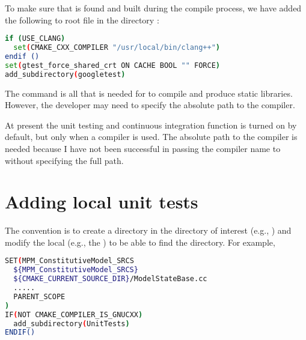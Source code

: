 To make sure that  is found and built during the compile process,
we have added the following to root  file in the directory
:
\begin{lstlisting}[language=sh, backgroundcolor=\color{background}]
if (USE_CLANG)
  set(CMAKE_CXX_COMPILER "/usr/local/bin/clang++")
endif ()
set(gtest_force_shared_crt ON CACHE BOOL "" FORCE)
add_subdirectory(googletest)
\end{lstlisting}

The 	command is all that is needed for  to 
compile  and produce static libraries.  However, the developer may
need to specify the absolute path to the  compiler.

\begin{NoteBox}
At present the unit testing and continuous integration function is turned on by
default, but only when a  compiler is used.  The absolute path to
the  compiler is needed because I have not been successful in passing 
the  compiler name to  without specifying the 
full path.  
\end{NoteBox}

\section{Adding local unit tests}
The \Vaango convention is to create a  directory in the directory 
of interest (e.g., ) and modify 
the local  (e.g., the )
to be able to find the  directory.  For example,
\begin{lstlisting}[language=sh, backgroundcolor=\color{background}]
SET(MPM_ConstitutiveModel_SRCS
  ${MPM_ConstitutiveModel_SRCS}
  ${CMAKE_CURRENT_SOURCE_DIR}/ModelStateBase.cc
  .....
  PARENT_SCOPE
)
IF(NOT CMAKE_COMPILER_IS_GNUCXX)
  add_subdirectory(UnitTests)
ENDIF()
\end{lstlisting}

